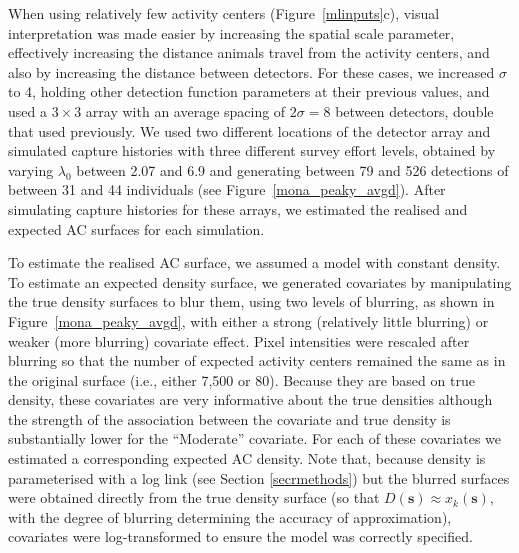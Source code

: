 \documentclass[10pt,a4paper]{article}
\begin{document}
When using relatively few activity centers (Figure~\ref{mlinputs}c), visual interpretation was made easier by increasing the spatial scale parameter, effectively increasing the distance animals travel from the activity centers, and also by increasing the distance between detectors. For these cases, we increased $\sigma$ to 4, holding other detection function parameters at their previous values, and used a $3 \times 3$ array with an average spacing of $2\sigma=8$ between detectors, double that used previously. We used two different locations of the detector array and simulated capture histories with three different survey effort levels, obtained by varying $\lambda_0$ between 2.07 and 6.9 and generating between 79 and 526 detections of between 31 and 44 individuals (see Figure~\ref{mona_peaky_avgd}). After simulating capture histories for these arrays, we estimated the realised and expected AC surfaces for each simulation. 

To estimate the realised AC surface, we assumed a model with constant density. To estimate an expected density surface, we generated covariates by manipulating the true density surfaces to blur them, using two levels of blurring, as shown in Figure~\ref{mona_peaky_avgd}, with either a strong (relatively little blurring) or weaker (more blurring) covariate effect. Pixel intensities were rescaled after blurring so that the number of expected activity centers remained the same as in the original surface (i.e., either 7,500 or 80). Because they are based on true density, these covariates are very informative about the true densities although the strength of the association between the covariate and true density is substantially lower for the ``Moderate'' covariate. For each of these covariates we estimated a corresponding expected AC density. Note that, because density is parameterised with a log link (see Section \ref{secrmethods}) but the blurred surfaces were obtained directly from the true density surface (so that $D(\mathbf{s})\approx x_k(\mathbf{s})$, with the degree of blurring determining the accuracy of approximation), covariates were log-transformed to ensure the model was correctly specified.
\end{document}

